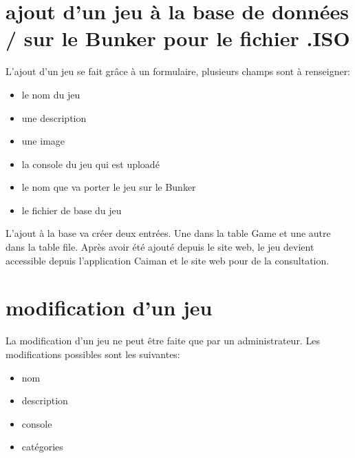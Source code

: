 \documentclass[a4paper,12pt,french]{sphinxmanual}
\begin{document}
\section{ajout d’un jeu à la base de données / sur le Bunker pour le fichier .ISO}
\label{\detokenize{fonctionnelleWeb:ajout-dun-jeu-a-la-base-de-donnees-sur-le-bunker-pour-le-fichier-iso}}
\sphinxAtStartPar
L’ajout d’un jeu se fait grâce à un formulaire, plusieurs champs sont à renseigner:
\begin{itemize}
\item {} 
\sphinxAtStartPar
le nom du jeu

\item {} 
\sphinxAtStartPar
une description

\item {} 
\sphinxAtStartPar
une image

\item {} 
\sphinxAtStartPar
la console du jeu qui est uploadé

\item {} 
\sphinxAtStartPar
le nom que va porter le jeu sur le Bunker

\item {} 
\sphinxAtStartPar
le fichier de base du jeu

\end{itemize}

\sphinxAtStartPar
L’ajout à la base va créer deux entrées. Une dans la table Game et une autre dans la table file. Après avoir été ajouté depuis le site web, le jeu devient accessible depuis l’application Caiman et le site web pour de la consultation.






\section{modification d’un jeu}
\label{\detokenize{fonctionnelleWeb:modification-dun-jeu}}
\sphinxAtStartPar
La modification d’un jeu ne peut être faite que par un administrateur. Les modifications possibles sont les suivantes:
\begin{itemize}
\item {} 
\sphinxAtStartPar
nom

\item {} 
\sphinxAtStartPar
description

\item {} 
\sphinxAtStartPar
console

\item {} 
\sphinxAtStartPar
catégories

\end{itemize}
\end{document}
